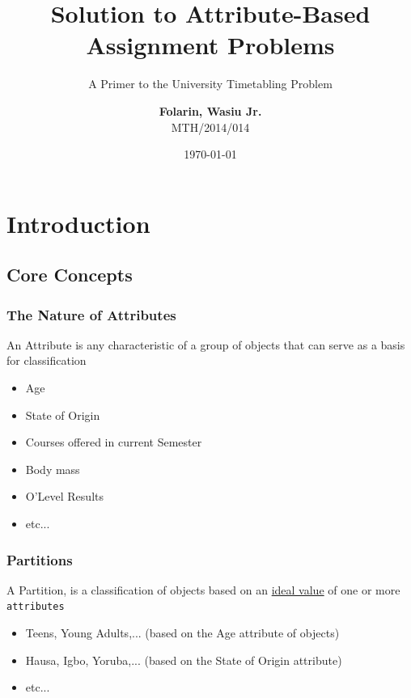 \documentclass[10pt]{beamer}
\title{Solution to Attribute-Based Assignment Problems}
\subtitle{A Primer to the University Timetabling Problem}
\author{\textbf{Folarin, Wasiu Jr.}\\ MTH/2014/014}
\institute{\textbf{Dr. B. S. Ogundare}\\ \textit{Supervisor}}
\date{\today}
\begin{document}
	\begin{frame}
		\titlepage
	\end{frame}


	\section{Introduction}
		\subsection{Core Concepts}
			\begin{frame}
				\frametitle{The Nature of Attributes}
				\begin{definition}
					An Attribute is any characteristic of a group of objects that can serve as a basis for classification
				\end{definition}
				\begin{example}
					\begin{itemize}
						\item Age
						\item State of Origin
						\item Courses offered in current Semester
						\item Body mass
						\item O'Level Results
						\item etc...
					\end{itemize}
				\end{example}
			\end{frame}

			\begin{frame}
				\frametitle{Partitions}
				\begin{definition}
					A Partition, is a classification of objects based on an \underline{ideal value} of one or more \texttt{attributes}
				\end{definition}
				\begin{example}
					\begin{itemize}
						\item Teens, Young Adults,... (based on the Age attribute of objects)
						\item Hausa, Igbo, Yoruba,... (based on the State of Origin attribute)
						\item etc...
					\end{itemize}
				\end{example}
			\end{frame}
\end{document}
